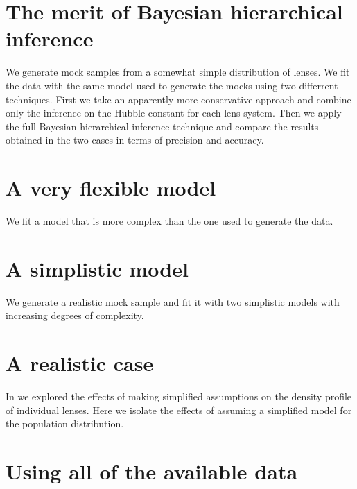 \documentclass[useAMS,usenatbib]{mn2e}
\begin{document}
\section{The merit of Bayesian hierarchical inference}\label{sec:expt1}

We generate mock samples from a somewhat simple distribution of lenses.
We fit the data with the same model used to generate the mocks using two differrent techniques. First we take an apparently more conservative approach and combine only the inference on the Hubble constant for each lens system.
Then we apply the full Bayesian hierarchical inference technique and compare the results obtained in the two cases in terms of precision and accuracy.


\section{A very flexible model}\label{sec:expt2}

We fit a model that is more complex than the one used to generate the data.



\section{A simplistic model}\label{sec:expt3}

We generate a realistic mock sample and fit it with two simplistic models with increasing degrees of complexity.


\section{A realistic case}\label{sec:expt4}

In  we explored the effects of making simplified assumptions on the density profile of individual lenses.
Here we isolate the effects of assuming a simplified model for the population distribution.



\section{Using all of the available data}\label{sec:expt5}
\end{document}
